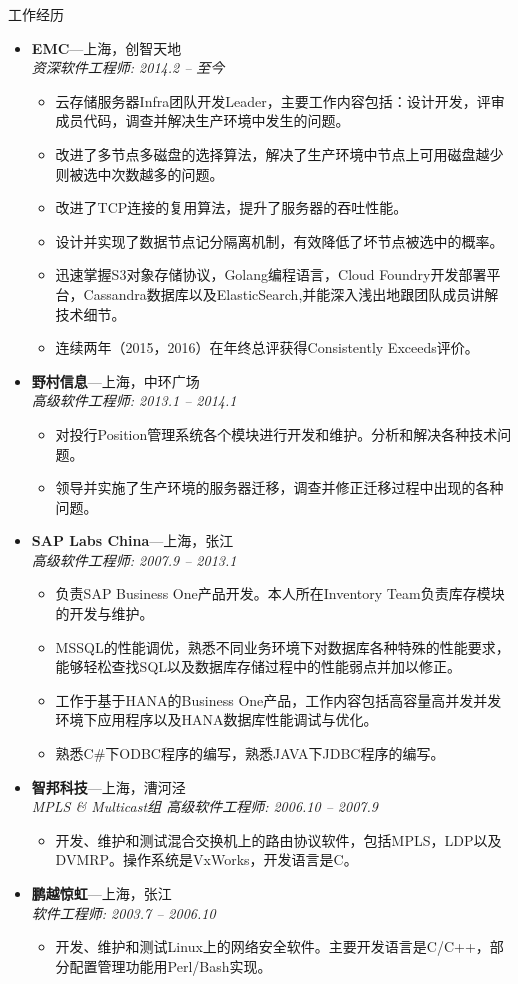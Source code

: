 \documentclass[11pt,oneside]{article}
\newenvironment{ressection}[1]{
	\vspace{4pt}
	{\selectfont\Large#1}
	\begin{itemize}
	\vspace{3pt}
}{
	\end{itemize}
}
\newcommand{\ressubitem}[1]{
	\vspace{-1pt}
	\item \begin{flushleft} #1 \end{flushleft}
}
\newcommand{\resbigitem}[3]{
	\vspace{-5pt}
	\item
	\textbf{#1}---#2 \\
	\textit{#3}
}
\newenvironment{ressubsec}[3]{
	\resbigitem{#1}{#2}{#3}
	\vspace{-2pt}
	\begin{itemize}
}{
    \end{itemize}
}
\begin{document}
\begin{ressection}{工作经历}

	\begin{ressubsec}{EMC}{上海，创智天地}{资深软件工程师: 2014.2 -- 至今}
		\ressubitem{云存储服务器Infra团队开发Leader，主要工作内容包括：设计开发，评审成员代码，调查并解决生产环境中发生的问题。}
		\ressubitem{改进了多节点多磁盘的选择算法，解决了生产环境中节点上可用磁盘越少则被选中次数越多的问题。}
		\ressubitem{改进了TCP连接的复用算法，提升了服务器的吞吐性能。}
		\ressubitem{设计并实现了数据节点记分隔离机制，有效降低了坏节点被选中的概率。}
		\ressubitem{迅速掌握S3对象存储协议，Golang编程语言，Cloud Foundry开发部署平台，Cassandra数据库以及ElasticSearch,并能深入浅出地跟团队成员讲解技术细节。}
		\ressubitem{连续两年（2015，2016）在年终总评获得Consistently Exceeds评价。}
	\end{ressubsec}

	\begin{ressubsec}{野村信息}{上海，中环广场}{高级软件工程师: 2013.1 -- 2014.1}
		\ressubitem{对投行Position管理系统各个模块进行开发和维护。分析和解决各种技术问题。}
		\ressubitem{领导并实施了生产环境的服务器迁移，调查并修正迁移过程中出现的各种问题。}
	\end{ressubsec}

	\begin{ressubsec}{SAP Labs China}{上海，张江}{高级软件工程师: 2007.9 -- 2013.1}
		\ressubitem{负责SAP Business One产品开发。本人所在Inventory Team负责库存模块的开发与维护。}
		\ressubitem{MSSQL的性能调优，熟悉不同业务环境下对数据库各种特殊的性能要求，
					能够轻松查找SQL以及数据库存储过程中的性能弱点并加以修正。}
		\ressubitem{工作于基于HANA的Business One产品，工作内容包括高容量高并发并发环境下应用程序以及HANA数据库性能调试与优化。}
		\ressubitem{熟悉C\#下ODBC程序的编写，熟悉JAVA下JDBC程序的编写。}
	\end{ressubsec}

	\begin{ressubsec}{智邦科技}{上海，漕河泾}{MPLS \& Multicast组 高级软件工程师: 2006.10 -- 2007.9}
		\ressubitem{开发、维护和测试混合交换机上的路由协议软件，包括MPLS，LDP以及DVMRP。操作系统是VxWorks，开发语言是C。}
	\end{ressubsec}

	\begin{ressubsec}{鹏越惊虹}{上海，张江}{软件工程师: 2003.7 -- 2006.10}
		\ressubitem{开发、维护和测试Linux上的网络安全软件。主要开发语言是C/C++，部分配置管理功能用Perl/Bash实现。}
	\end{ressubsec}

\end{ressection}
\end{document}
